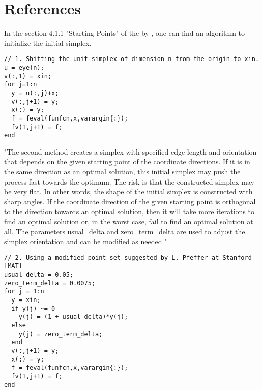 \section{References}

In the section 4.1.1 "Starting Points" of the \cite{} by ,
one can find an algorithm to initialize the initial simplex.

\lstset{language=Scilab}
\lstset{numbers=left}
\begin{lstlisting}
// 1. Shifting the unit simplex of dimension n from the origin to xin.
u = eye(n);
v(:,1) = xin;
for j=1:n
  y = u(:,j)+x;
  v(:,j+1) = y;
  x(:) = y;
  f = feval(funfcn,x,varargin{:});
  fv(1,j+1) = f;
end
\end{lstlisting}


"The second method creates a simplex with specified edge length
and orientation that depends on the given starting point of the coordinate
directions. If it is in the same direction as an optimal solution, this initial
simplex may push the process fast towards the optimum. The risk is that
the constructed simplex may be very flat. In other words, the shape of the
initial simplex is constructed with sharp angles. If the coordinate direction
of the given starting point is orthogonal to the direction towards an optimal
solution, then it will take more iterations to find an optimal solution
or, in the worst case, fail to find an optimal solution at all. The parameters
usual_delta and zero_term_delta are used to adjust the simplex orientation
and can be modified as needed."

\lstset{language=Scilab}
\lstset{numbers=left}
\begin{lstlisting}
// 2. Using a modified point set suggested by L. Pfeffer at Stanford [MAT]
usual_delta = 0.05; 
zero_term_delta = 0.0075;
for j = 1:n
  y = xin;
  if y(j) ~= 0
    y(j) = (1 + usual_delta)*y(j);
  else
    y(j) = zero_term_delta;
  end
  v(:,j+1) = y;
  x(:) = y; 
  f = feval(funfcn,x,varargin{:});
  fv(1,j+1) = f;
end
\end{lstlisting}

